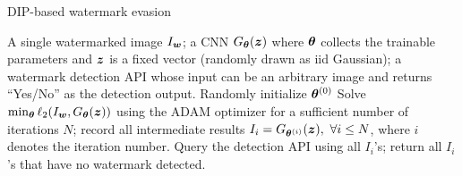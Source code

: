 \begin{algorithm}[!htbp]
\caption{DIP-based watermark evasion}
\label{alg: DIP evasion}
\begin{algorithmic}[1]
\Require A single watermarked image $I_{\boldsymbol w}$; a CNN $G_{\boldsymbol \theta} (\boldsymbol z)$ where $\boldsymbol \theta$ collects the trainable parameters and $\boldsymbol z$ is a fixed vector (randomly drawn as iid Gaussian); a watermark detection API whose input can be an arbitrary image and returns ``Yes/No'' as the detection output. 
\State Randomly initialize $\boldsymbol \theta^{(0)}$
\State Solve $\min_{\boldsymbol \theta} \ell_2 (I_{\boldsymbol w}, G_{\boldsymbol \theta}(\boldsymbol z))$ using the ADAM optimizer for a sufficient number of iterations $N$; record all intermediate results $I_i = G_{\boldsymbol \theta^{(i)}}(\boldsymbol z), ~ \forall i \leq N$, where $i$ denotes the iteration number.
\State Query the detection API using all $I_i$'s; return all $I_i$'s that have no watermark detected.
\end{algorithmic}%
\end{algorithm}